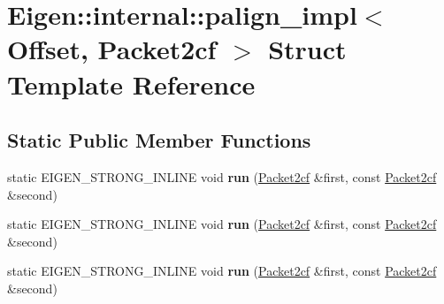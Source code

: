 \hypertarget{struct_eigen_1_1internal_1_1palign__impl_3_01_offset_00_01_packet2cf_01_4}{}\section{Eigen\+:\+:internal\+:\+:palign\+\_\+impl$<$ Offset, Packet2cf $>$ Struct Template Reference}
\label{struct_eigen_1_1internal_1_1palign__impl_3_01_offset_00_01_packet2cf_01_4}
\subsection*{Static Public Member Functions}
\begin{DoxyCompactItemize}
\item 
\mbox{\label{struct_eigen_1_1internal_1_1palign__impl_3_01_offset_00_01_packet2cf_01_4_a646ffaa2ab1f139214316298785aec89}} 
static E\+I\+G\+E\+N\+\_\+\+S\+T\+R\+O\+N\+G\+\_\+\+I\+N\+L\+I\+NE void {\bfseries run} (\hyperlink{struct_eigen_1_1internal_1_1_packet2cf}{Packet2cf} \&first, const \hyperlink{struct_eigen_1_1internal_1_1_packet2cf}{Packet2cf} \&second)
\item 
\mbox{\label{struct_eigen_1_1internal_1_1palign__impl_3_01_offset_00_01_packet2cf_01_4_a646ffaa2ab1f139214316298785aec89}} 
static E\+I\+G\+E\+N\+\_\+\+S\+T\+R\+O\+N\+G\+\_\+\+I\+N\+L\+I\+NE void {\bfseries run} (\hyperlink{struct_eigen_1_1internal_1_1_packet2cf}{Packet2cf} \&first, const \hyperlink{struct_eigen_1_1internal_1_1_packet2cf}{Packet2cf} \&second)
\item 
\mbox{\label{struct_eigen_1_1internal_1_1palign__impl_3_01_offset_00_01_packet2cf_01_4_a646ffaa2ab1f139214316298785aec89}} 
static E\+I\+G\+E\+N\+\_\+\+S\+T\+R\+O\+N\+G\+\_\+\+I\+N\+L\+I\+NE void {\bfseries run} (\hyperlink{struct_eigen_1_1internal_1_1_packet2cf}{Packet2cf} \&first, const \hyperlink{struct_eigen_1_1internal_1_1_packet2cf}{Packet2cf} \&second)
\item 
\mbox{\label{struct_eigen_1_1internal_1_1palign__impl_3_01_offset_00_01_packet2cf_01_4_a646ffaa2ab1f139214316298785aec89}} 

\end{DoxyCompactItemize}
